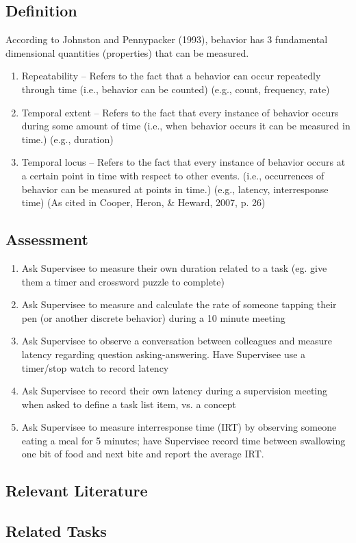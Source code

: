 \subsection{Definition}
According to Johnston and Pennypacker (1993), behavior has 3 fundamental dimensional quantities (properties) that can be measured.
\begin{enumerate}
\item Repeatability – Refers to the fact that a behavior can occur repeatedly through time (i.e., behavior can be counted) (e.g., count, frequency, rate)
\item Temporal extent – Refers to the fact that every instance of behavior occurs during some amount of time (i.e., when behavior occurs it can be measured in time.) (e.g., duration)
\item Temporal locus – Refers to the fact that every instance of behavior occurs at a certain point in time with respect to other events. (i.e., occurrences of behavior can be measured at points in time.) (e.g., latency, interresponse time) (As cited in Cooper, Heron, \& Heward, 2007, p. 26)
\end{enumerate}
%
\subsection{Assessment}
\begin{enumerate}
\item Ask Supervisee to measure their own duration related to a task (eg. give them a timer and crossword puzzle to complete)
\item Ask Supervisee to measure and calculate the rate of someone tapping their pen (or another discrete behavior) during a 10 minute meeting
\item Ask Supervisee to observe a conversation between colleagues and measure latency regarding question asking-answering.  Have Supervisee use a timer/stop watch to record latency
\item Ask Supervisee to record their own latency during a supervision meeting when asked to define a task list item, vs. a concept 
\item Ask Supervisee to measure interresponse time (IRT) by observing someone eating a meal for 5 minutes; have Supervisee record time between swallowing one bit of food and next bite and report the average IRT.
%
\end{enumerate}
%
\subsection{Relevant Literature}
\begin{refsection}
\nocite{cooper2007applied,
        johnston2010strategies,
        thomason2011response,
        worsdell2002duration}
\printbibliography[heading=none]
\end{refsection}
%
\subsection{Related Tasks}
\fouraOne{}\\
\fouraTwo{}\\
\fouraThree{}\\
\fouraFour{}\\
\fouraFive{}\\
\fouraNine{}\\
\fourdTwentyOne{}\\
